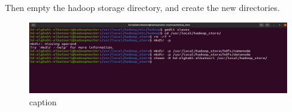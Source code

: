 \begin{spacing}{1.2}
\par Then empty the hadoop storage directory, and create the new directories.
\\
\begin{figure}[!htb] 
\begin{center} 
\includegraphics[width=1\linewidth]{Big_Data/Hadoop/Multi-Nodes Cluster/Creating new storage repo.jpg} 
\end{center} 
\caption{caption} 
\end{figure} 
\FloatBarrier
\end{spacing}